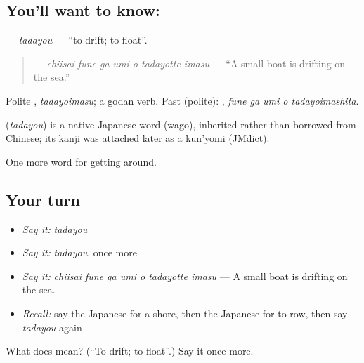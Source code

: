 \subsection*{You'll want to know: }
\textbf{} — \emph{tadayou} — \textquotedblleft{}to drift; to float\textquotedblright{}.

\begin{quote}
\textbf{   } — \emph{chiisai fune ga umi o tadayotte imasu} — \textquotedblleft{}A small boat is drifting on the sea.\textquotedblright{}
\end{quote}

Polite \textbf{}, \emph{tadayoimasu}; a godan verb. Past (polite): \textbf{  }, \emph{fune ga umi o tadayoimashita}.

\begin{cousinweb}
\textbf{} (\emph{tadayou}) is a native Japanese word (wago), inherited rather than borrowed from Chinese; its kanji was attached later as a kun'yomi (JMdict).
\end{cousinweb}

\begin{grammarlens}[title={What you've built}]
One more word for getting around.
\end{grammarlens}

\subsection*{Your turn}
\begin{itemize}
\raggedright
  \item \emph{Say it:} \emph{tadayou}
  \item \emph{Say it:} \emph{tadayou}, once more
  \item \emph{Say it:} \emph{chiisai fune ga umi o tadayotte imasu} — A small boat is drifting on the sea.
  \item \emph{Recall:} say the Japanese for a shore, then the Japanese for to row, then say \emph{tadayou} again
\end{itemize}

\begin{tcolorbox}[breakable,colback=teal!4,colframe=teal!35!black,title={Before you move on}]
What does  mean? (\textquotedblleft{}To drift; to float\textquotedblright{}.) Say it once more.
\end{tcolorbox}
